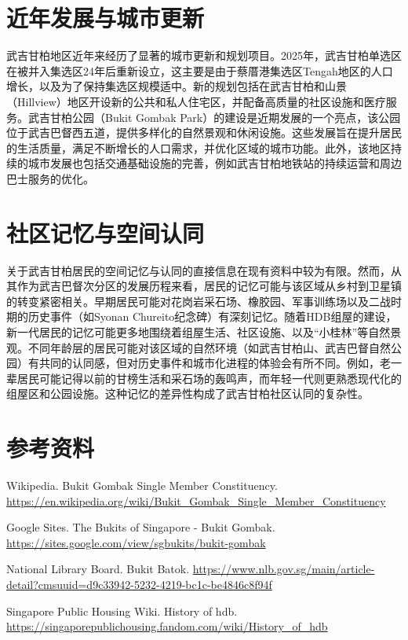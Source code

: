 \documentclass[11pt,a4paper,twoside,openany]{book}
\begin{document}
\section{近年发展与城市更新}
武吉甘柏地区近年来经历了显著的城市更新和规划项目。2025年，武吉甘柏单选区在被并入集选区24年后重新设立，这主要是由于蔡厝港集选区Tengah地区的人口增长，以及为了保持集选区规模适中。新的规划包括在武吉甘柏和山景（Hillview）地区开设新的公共和私人住宅区，并配备高质量的社区设施和医疗服务。武吉甘柏公园（Bukit Gombak Park）的建设是近期发展的一个亮点，该公园位于武吉巴督西五道，提供多样化的自然景观和休闲设施。这些发展旨在提升居民的生活质量，满足不断增长的人口需求，并优化区域的城市功能。此外，该地区持续的城市发展也包括交通基础设施的完善，例如武吉甘柏地铁站的持续运营和周边巴士服务的优化。

\section{社区记忆与空间认同}
关于武吉甘柏居民的空间记忆与认同的直接信息在现有资料中较为有限。然而，从其作为武吉巴督次分区的发展历程来看，居民的记忆可能与该区域从乡村到卫星镇的转变紧密相关。早期居民可能对花岗岩采石场、橡胶园、军事训练场以及二战时期的历史事件（如Syonan Chureito纪念碑）有深刻记忆。随着HDB组屋的建设，新一代居民的记忆可能更多地围绕着组屋生活、社区设施、以及“小桂林”等自然景观。不同年龄层的居民可能对该区域的自然环境（如武吉甘柏山、武吉巴督自然公园）有共同的认同感，但对历史事件和城市化进程的体验会有所不同。例如，老一辈居民可能记得以前的甘榜生活和采石场的轰鸣声，而年轻一代则更熟悉现代化的组屋区和公园设施。这种记忆的差异性构成了武吉甘柏社区认同的复杂性。

\section*{参考资料}
\begin{enumerate}[label={[\arabic*]},leftmargin=*,topsep=2pt,itemsep=1pt,parsep=0pt]
  \item Wikipedia. Bukit Gombak Single Member Constituency. \url{https://en.wikipedia.org/wiki/Bukit_Gombak_Single_Member_Constituency}
  \item Google Sites. The Bukits of Singapore - Bukit Gombak. \url{https://sites.google.com/view/sgbukits/bukit-gombak}
  \item National Library Board. Bukit Batok. \url{https://www.nlb.gov.sg/main/article-detail?cmsuuid=d9c33942-5232-4219-bc1c-be4846c8f94f}
  \item Singapore Public Housing Wiki. History of hdb. \url{https://singaporepublichousing.fandom.com/wiki/History_of_hdb}
\end{enumerate}
\end{document}
